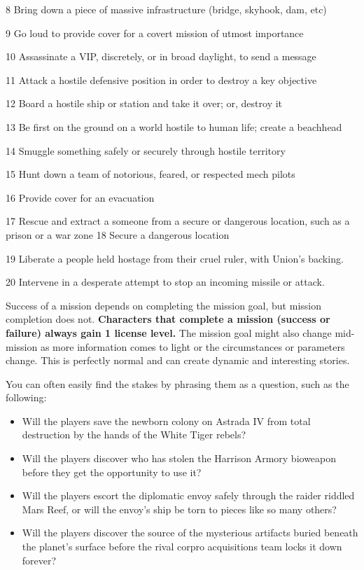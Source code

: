  8         Bring down a piece of massive infrastructure (bridge, skyhook, dam, etc)

 9         Go loud to provide cover for a covert mission of utmost importance

  10       Assassinate a VIP, discretely, or in broad daylight, to send a message

  11       Attack a hostile defensive position in order to destroy a key objective

  12       Board a hostile ship or station and take it over; or, destroy it

  13       Be first on the ground on a world hostile to human life; create a beachhead

  14       Smuggle something safely or securely through hostile territory

  15       Hunt down a team of notorious, feared, or respected mech pilots

  16       Provide cover for an evacuation

  17       Rescue and extract a someone from a secure or dangerous location, such as a prison
           or a war zone
  18       Secure a dangerous location

  19       Liberate a people held hostage from their cruel ruler, with Union's backing.

  20       Intervene in a desperate attempt to stop an incoming missile or attack.

Success of a mission depends on completing the mission goal, but mission completion does
not. \textbf{Characters that complete a mission (success or failure) always gain 1 license level.} The
mission goal might also change mid-mission as more information comes to light or the
circumstances or parameters change. This is perfectly normal and can create dynamic and
interesting stories.

You can often easily find the stakes by phrasing them as a question, such as the following:
\begin{itemize}
\item Will the players save the newborn colony on Astrada IV from total destruction by the hands of the White Tiger rebels?
\item Will the players discover who has stolen the Harrison Armory bioweapon before they get the opportunity to use it?
\item Will the players escort the diplomatic envoy safely through the raider riddled Mars Reef, or will the envoy's ship be torn to pieces like so many others?
\item Will the players discover the source of the mysterious artifacts buried beneath the planet's surface before the rival corpro acquisitions team locks it down forever?
\end{itemize}  

